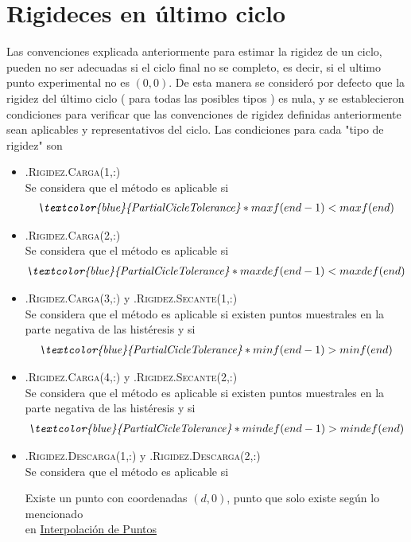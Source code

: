 \documentclass[a4paper, 11pt,article,oneside]{memoir}%
\begin{document}
\section{Rigideces en último ciclo}
Las convenciones explicada anteriormente para estimar la rigidez de un ciclo, pueden no ser adecuadas si el ciclo final no se completo, es decir, si el ultimo  punto experimental no es $(0,0)$. De esta manera se consideró por defecto que la rigidez del último ciclo ( para todas las posibles tipos ) es nula, y se establecieron condiciones para verificar que las convenciones de rigidez definidas anteriormente sean aplicables y representativos del ciclo. Las condiciones para cada "tipo de rigidez" son
\begin{itemize}
    \item \textsc{.Rigidez.Carga(1,:)}\\
    Se considera que el método es aplicable si 
    \begin{align*}
        \textit{\textcolor{blue}{PartialCicleTolerance}}*maxf(end-1)<maxf(end)
    \end{align*}
    \item \textsc{.Rigidez.Carga(2,:)}\\
    Se considera que el método es aplicable si 
    \begin{align*}
        \textit{\textcolor{blue}{PartialCicleTolerance}}*maxdef(end-1)<maxdef(end)
    \end{align*}
    \item \textsc{.Rigidez.Carga(3,:)} y \textsc{.Rigidez.Secante(1,:)}\\
    Se considera que el método es aplicable si existen puntos muestrales en la parte negativa de las histéresis y si 
    \begin{align*}
       \textit{\textcolor{blue}{PartialCicleTolerance}}*minf(end-1)>minf(end)
    \end{align*}
     \item \textsc{.Rigidez.Carga(4,:)} y \textsc{.Rigidez.Secante(2,:)}\\
    Se considera que el método es aplicable si existen puntos muestrales en la parte negativa de las histéresis y si 
    \begin{align*}
       \textit{\textcolor{blue}{PartialCicleTolerance}}*mindef(end-1)>mindef(end)
    \end{align*}
    \item \textsc{.Rigidez.Descarga(1,:)} y \textsc{.Rigidez.Descarga(2,:)} \\
    Se considera que el método es aplicable si
    \begin{center}
         Existe un punto con coordenadas $(d,0)$, punto que  solo existe según lo mencionado \\en \hyperref[subsec: interp]{Interpolación de Puntos}
    \end{center}
   

\end{itemize}
\end{document}
